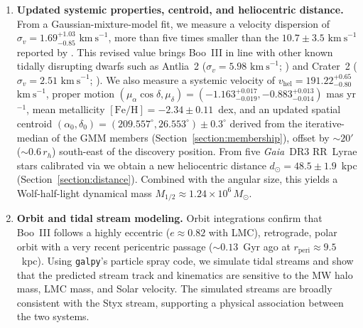 \documentclass[twocolumn, apj, numberedappendix, appendixfloats]{openjournal_dhayaa}
\newcommand{\gaia}{\textit{Gaia}\xspace}
\newcommand{\vlosUnits}{$\mathrm{km~s}^{-1}$\xspace}
\newcommand{\pmUnits}{mas yr$^{-1}$\xspace}
\begin{document}
\begin{enumerate}[leftmargin=*]

\item \textbf{Updated systemic properties, centroid, and heliocentric distance.} From a Gaussian-mixture-model fit, we measure a velocity dispersion of $\sigma_{v} = 1.69^{+1.03}_{-0.85}$ \vlosUnits, more than five times smaller than the $10.7 \pm 3.5$ \vlosUnits reported by \citet{Carlin2018}. This revised value brings Boo~III in line with other known tidally disrupting dwarfs such as Antlia~2 ($\sigma_v = 5.98$ \vlosUnits; \citealt{Ji2021}) and Crater~2 ($\sigma_v = 2.51$ \vlosUnits; \citealt{Limberg2025}). We also measure a systemic velocity of $v_{\mathrm{hel}} = 191.22^{+0.65}_{-0.80}$ \vlosUnits, proper motion $(\mu_{\alpha} \cos{\delta}, \mu_\delta) = (-1.163^{+0.017}_{-0.019}, -0.883^{+0.013}_{-0.014})$ \pmUnits, mean metallicity $\mathrm{[Fe/H]} = -2.34 \pm 0.11$~dex, and an updated spatial centroid $(\alpha_0, \delta_0) = (209.557^\circ, 26.553^\circ) \pm 0.3^\circ$ derived from the iterative-median of the GMM members (Section~\ref{section:membership}), offset by $\sim 20'$ ($\sim 0.6\,r_h$) south-east of the \citet{Grillmair2009} discovery position. From five \gaia\ DR3 RR~Lyrae stars calibrated via \citet{Garofalo2022} we obtain a new heliocentric distance $d_\odot = 48.5 \pm 1.9$~kpc (Section~\ref{section:distance}). Combined with the \citet{Moskowitz2020} angular size, this yields a Wolf-half-light dynamical mass $M_{1/2} \approx 1.24 \times 10^{6}\,M_\odot$.

\item \textbf{Orbit and tidal stream modeling.} Orbit integrations confirm that Boo~III follows a highly eccentric ($e \approx 0.82$ with LMC), retrograde, polar orbit with a very recent pericentric passage ($\sim 0.13$~Gyr ago at $r_{\mathrm{peri}} \approx 9.5$~kpc). Using \texttt{galpy}'s particle spray code, we simulate tidal streams and show that the predicted stream track and kinematics are sensitive to the MW halo mass, LMC mass, and Solar velocity. The simulated streams are broadly consistent with the Styx stream, supporting a physical association between the two systems.


\end{enumerate}
\end{document}
